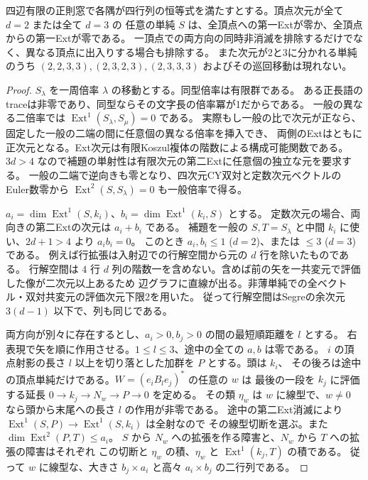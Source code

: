 \begin{theorem}\label{thm:one-sided-balanced-small-simples}
四辺有限の正則窓で各隅が四行列の恒等式を満たすとする。頂点次元が全て $d=2$ または全て $d=3$ の
任意の単純 $S$ は、全頂点への第一Extが零か、全頂点からの第一Extが零である。
一頂点での両方向の同時非消滅を排除するだけでなく、異なる頂点に出入りする場合も排除する。
また次元が2と3に分かれる単純のうち $(2,2,3,3),(2,3,2,3),(2,3,3,3)$ およびその巡回移動は現れない。
\end{theorem}
\begin{proof}
$S_\lambda$ を一周倍率 $\lambda$ の移動とする。同型倍率は有限群である。
ある正長語のtraceは非零であり、同型ならその文字長の倍率冪が1だからである。
一般の異なる二倍率では $\operatorname{Ext}^1(S_\lambda,S_\mu)=0$ である。
実際もし一般の比で次元が正なら、固定した一般の二端の間に任意個の異なる倍率を挿入でき、
両側のExtはともに正次元となる。Ext次元は有限Koszul複体の階数による構成可能関数である。
$3d>4$ なので補題の単射性は有限次元の第二Extに任意個の独立な元を要求する。
一般の二端で逆向きも零となり、四次元CY双対と定数次元ベクトルのEuler数零から
$\operatorname{Ext}^2(S,S_\lambda)=0$ も一般倍率で得る。

$a_i=\dim\operatorname{Ext}^1(S,k_i)$、$b_i=\dim\operatorname{Ext}^1(k_i,S)$ とする。
定数次元の場合、両向きの第二Extの次元は $a_i+b_i$ である。
補題を一般の $S,T=S_\lambda$ と中間 $k_i$ に使い、$2d+1>4$ より $a_i b_i=0$。
このとき $a_i,b_i\le1$ ($d=2$)、または $\le3$ ($d=3$) である。
例えば行拡張は入射辺での行解空間から元の $d$ 行を除いたものである。
行解空間は $4$ 行 $d$ 列の階数一を含めない。含めば前の矢を一共変元で評価した像が二次元以上あるため
辺グラフに直線が出る。非薄単純での全ベクトル・双対共変元の評価次元下限2を用いた。
従って行解空間はSegreの余次元 $3(d-1)$ 以下で、列も同じである。

両方向が別々に存在するとし、$a_i>0,b_j>0$ の間の最短順距離を $l$ とする。
右表現で矢を順に作用させる。$1\le l\le3$、途中の全ての $a,b$ は零である。
$i$ の頂点射影の長さ $l$ 以上を切り落とした加群を $P$ とする。頭は $k_i$、
その後ろは途中の頂点単純だけである。$W=(e_i B_l e_j)^*$ の任意の $w$ は
最後の一段を $k_j$ に評価する延長 $0\to k_j\to N_w\to P\to0$ を定める。
その類 $\eta_w$ は $w$ に線型で、$w\ne0$ なら頭から末尾への長さ $l$ の作用が非零である。
途中の第二Ext消滅により $\operatorname{Ext}^1(S,P)\to\operatorname{Ext}^1(S,k_i)$ は全射なので
その線型切断を選ぶ。また $\dim\operatorname{Ext}^2(P,T)\le a_i$。
$S$ から $N_w$ への拡張を作る障害と、$N_w$ から $T$ への拡張の障害はそれぞれ
この切断と $\eta_w$ の積、$\eta_w$ と $\operatorname{Ext}^1(k_j,T)$ の積である。
従って $w$ に線型な、大きさ $b_j\times a_i$ と高々 $a_i\times b_j$ の二行列である。


\end{proof}
